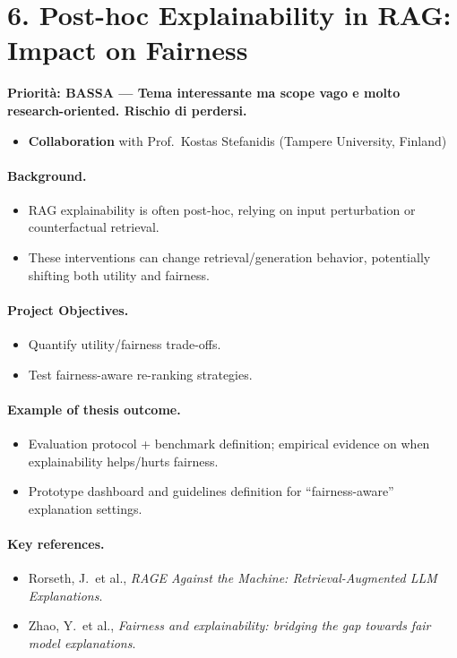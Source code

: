\documentclass[a4paper,11pt]{article}
\newcommand{\priorita}[1]{%
  \par\smallskip\noindent\textbf{Priorit\`a: #1}\par\smallskip
}
\begin{document}
\section{6. Post-hoc Explainability in RAG: Impact on Fairness}

\priorita{BASSA --- Tema interessante ma scope vago e molto research-oriented. Rischio di perdersi.}

\begin{itemize}[nosep]
  \item \textbf{Collaboration} with Prof.\ Kostas Stefanidis (Tampere University, Finland)
\end{itemize}

\paragraph{Background.}
\begin{itemize}[nosep]
  \item RAG explainability is often post-hoc, relying on input perturbation or counterfactual retrieval.
  \item These interventions can change retrieval/generation behavior, potentially shifting both utility and fairness.
\end{itemize}

\paragraph{Project Objectives.}
\begin{itemize}[nosep]
  \item Quantify utility/fairness trade-offs.
  \item Test fairness-aware re-ranking strategies.
\end{itemize}

\paragraph{Example of thesis outcome.}
\begin{itemize}[nosep]
  \item Evaluation protocol + benchmark definition; empirical evidence on when explainability helps/hurts fairness.
  \item Prototype dashboard and guidelines definition for ``fairness-aware'' explanation settings.
\end{itemize}

\paragraph{Key references.}
\begin{itemize}[nosep]
  \item Rorseth, J.\ et al., \emph{RAGE Against the Machine: Retrieval-Augmented LLM Explanations}.
  \item Zhao, Y.\ et al., \emph{Fairness and explainability: bridging the gap towards fair model explanations}.
\end{itemize}
\end{document}
